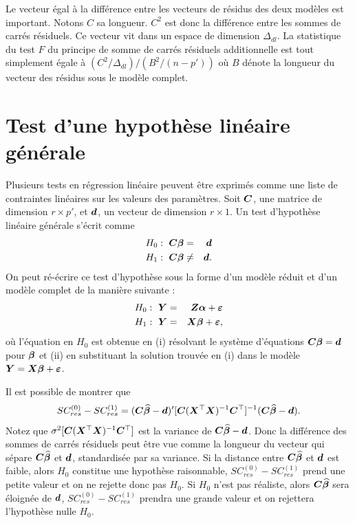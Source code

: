 Le vecteur égal à la différence entre les vecteurs de résidus des
deux mod\`eles est important. Notons $C$ sa longueur. $C^2$ est donc la différence entre les sommes
de carrés résiduels. Ce vecteur vit dans un espace de
dimension $\Delta_{dl}$. La statistique du test $F$ du principe de
somme de carrés résiduels additionnelle est tout simplement
égale \`a $(C^2/\Delta_{dl})/(B^2/(n-p'))$ où $B$ dénote la longueur du vecteur des résidus sous le modèle complet.

\section{Test d'une hypoth\`ese linéaire générale}
\label{sec:hyplingen}

Plusieurs tests en régression linéaire peuvent être exprimés comme une liste de contraintes linéaires sur les valeurs des param\`etres. Soit ${\bm{C}}$, une matrice de dimension
$r\times p'$, et ${\bm{d}}$, un vecteur de dimension $r\times1$. Un test d'hypoth\`ese linéaire
générale s'écrit comme
\begin{eqnarray}\label{H0:lingen}
H_0:~{\bm{C}}\bm\beta&=&{\bm{d}}\\
H_1:~{\bm{C}}\bm\beta&\neq&{\bm{d}}.\nonumber
\end{eqnarray}
On peut ré-écrire ce test d'hypoth\`ese sous la forme d'un mod\`ele réduit et d'un mod\`ele
complet de la manière suivante :
\begin{eqnarray*}
H_0:~\bm{Y}&=&{\bm{Z}}{\bm{\alpha}}+\bm\varepsilon\\
H_1:~\bm{Y}&=&\bm{X}\bm\beta+\bm\varepsilon,
\end{eqnarray*}
où l'équation en $H_0$ est obtenue en (i) résolvant le système d'équations
${\bm{C}}\bm\beta={\bm{d}}$ pour $\bm\beta$ et (ii) en substituant la solution trouvée en (i)
dans le modèle $\bm{Y}=\bm{X}\bm\beta+\bm\varepsilon$.

Il est possible de
montrer \citep[voir par e.g.][pp. 44--45 et pp. 60--64]{Sen_Sri:90} que
$$SC_{res}^{(0)}-SC_{res}^{(1)}=({\bm{C}}\widehat{\bm\beta}-{\bm{d}})'[{\bm{C}}(\bm{X}^\top\bm{X})^{-1}{\bm{C}}^\top]^{-1}({\bm{C}}
\widehat{\bm\beta}-{\bm{d}}).$$
Notez que $\sigma^2[{\bm{C}}(\bm{X}^\top\bm{X})^{-1}{\bm{C}}^\top]$ est la variance de ${\bm{C}}\widehat{\bm\beta}-{\bm{d}}$. Donc
la différence des sommes de carrés résiduels peut \^etre vue comme la longueur du vecteur
qui sépare ${\bm{C}}\widehat{\bm\beta}$ et ${\bm{d}}$, standardisée par sa variance. Si la distance entre
${\bm{C}}\widehat{\bm\beta}$ et ${\bm{d}}$ est faible, alors $H_0$ constitue une hypothèse raisonnable, $SC_{res}^{(0)}-
SC_{res}^{(1)}$ prend une petite valeur et on ne rejette donc pas $H_0$. Si $H_0$ n'est pas réaliste, alors
${\bm{C}}\widehat{\bm\beta}$ sera éloignée de ${\bm{d}}$, $SC_{res}^{(0)}-SC_{res}^{(1)}$ prendra une grande valeur
et on rejettera l'hypothèse nulle $H_0$.

